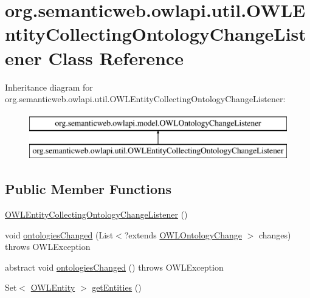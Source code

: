 \hypertarget{classorg_1_1semanticweb_1_1owlapi_1_1util_1_1_o_w_l_entity_collecting_ontology_change_listener}{\section{org.\-semanticweb.\-owlapi.\-util.\-O\-W\-L\-Entity\-Collecting\-Ontology\-Change\-Listener Class Reference}
\label{classorg_1_1semanticweb_1_1owlapi_1_1util_1_1_o_w_l_entity_collecting_ontology_change_listener}
}
Inheritance diagram for org.\-semanticweb.\-owlapi.\-util.\-O\-W\-L\-Entity\-Collecting\-Ontology\-Change\-Listener\-:\begin{figure}[H]
\begin{center}
\leavevmode
\includegraphics[height=2.000000cm]{classorg_1_1semanticweb_1_1owlapi_1_1util_1_1_o_w_l_entity_collecting_ontology_change_listener}
\end{center}
\end{figure}
\subsection*{Public Member Functions}
\begin{DoxyCompactItemize}
\item 
\hyperlink{classorg_1_1semanticweb_1_1owlapi_1_1util_1_1_o_w_l_entity_collecting_ontology_change_listener_a1727b321e20ca699cd63687f38f19dfa}{O\-W\-L\-Entity\-Collecting\-Ontology\-Change\-Listener} ()
\item 
void \hyperlink{classorg_1_1semanticweb_1_1owlapi_1_1util_1_1_o_w_l_entity_collecting_ontology_change_listener_a3e264b7794f1a0c0130f742909923252}{ontologies\-Changed} (List$<$?extends \hyperlink{classorg_1_1semanticweb_1_1owlapi_1_1model_1_1_o_w_l_ontology_change}{O\-W\-L\-Ontology\-Change} $>$ changes)  throws O\-W\-L\-Exception 
\item 
abstract void \hyperlink{classorg_1_1semanticweb_1_1owlapi_1_1util_1_1_o_w_l_entity_collecting_ontology_change_listener_aba0f2d311ad9e59adb7c5b1334fae180}{ontologies\-Changed} ()  throws O\-W\-L\-Exception
\item 
Set$<$ \hyperlink{interfaceorg_1_1semanticweb_1_1owlapi_1_1model_1_1_o_w_l_entity}{O\-W\-L\-Entity} $>$ \hyperlink{classorg_1_1semanticweb_1_1owlapi_1_1util_1_1_o_w_l_entity_collecting_ontology_change_listener_a65c38b12e0f4ef1db9056a4a6cdd604c}{get\-Entities} ()
\end{DoxyCompactItemize}
